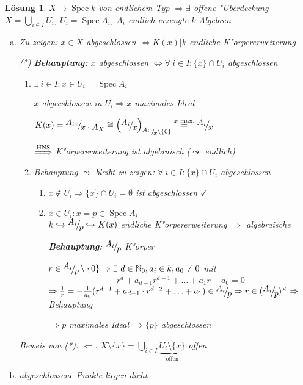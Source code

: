 \documentclass[paper = A4, fontsize=12pt, numbers=noendperiod, chapterprefix=true]{scrbook}
\theoremstyle{break}
\newtheorem{Loes}{L\"osung}
\theoremstyle{nonumberbreak}
\theoremstyle{nonumberplain}
\newcommand{\quot}[1]{\textrm{\glqq}{#1}\textrm{\grqq}}
\newcommand{\Bigcup}{\bigcup\limits}
\newenvironment{twosidedproof}{\begin{enumerate}[\quot{$\Rightarrow$}:]}{\end{enumerate}}
\newcommand{\proofforward}{\item[\quot{$\Rightarrow$}:]}
\newcommand{\proofreverse}{\item[\quot{$\Leftarrow$}:]}
\DeclareMathOperator{\Spec}{Spec}
\newcommand{\N}{\mathbb{N}}
\newcommand{\X}{\times}
\newcommand{\FakRaum}[2]{
	\raisebox{0.7ex}{\ensuremath{#1}}
	\ensuremath{\mkern-3mu}\big/\ensuremath{\mkern-3mu}
	\raisebox{-0.6ex}{\ensuremath{#2}}}
\newcommand{\smallFakRaum}[2]{
	\scriptsize{\raisebox{0.7ex}{\ensuremath{#1}}
	\ensuremath{\mkern-3mu}\ / \ensuremath{\mkern-3mu}
	\raisebox{-0.6ex}{\ensuremath{#2}}}}
\begin{document}
\begin{Loes}
$X \to \Spec k$ von endlichem Typ $\Rightarrow \exists$ offene "Uberdeckung $X = \bigcup_{i\in I} U_i$, $U_i = \Spec A_i$, $A_i$ endlich erzeugte $k$-Algebren
\begin{enumerate}[a)]
\item
	\emph{Zu zeigen:} $x \in X$ abgeschlossen $\Leftrightarrow K(x)|k$ endliche K"orpererweiterung
	
	(*) \textbf{Behauptung:} $x$ abgeschlossen $\Leftrightarrow \forall \ i \in I: \{x\} \cap U_i$ abgeschlossen
	
	\begin{twosidedproof}
	\proofforward
		$\exists \ i \in I: x \in U_i = \Spec A_i$
		
		$x$ abgecshlossen in $U_i \Rightarrow x$ maximales Ideal
		
		$K(x) = \FakRaum{A_{ix}}{x \cdot A_X} \cong \left( \FakRaum{A_i}{x} \right)_{\smallFakRaum{A_i}{x} \setminus \{0\}} \overset{x \text{ max.}}{=} \FakRaum{A_i}{x}$
		
		$\xRightarrow{\text{HNS}}$ K"orpererweiterung ist algebraisch ($\leadsto$ endlich)
	\proofreverse
		Behauptung $\leadsto$ bleibt zu zeigen: $\forall \ i \in I: \{x\} \cap U_i$ abgeschlossen
		\begin{enumerate}[$\bullet$)]
		\item
			$x \notin U_i \Rightarrow \{x\} \cap U_i = \emptyset$ ist abgeschlossen $\checkmark$
		\item
			$x \in U_i: x = p \in \Spec A_i$\\
			$k \hookrightarrow \FakRaum{A_i}{p} \hookrightarrow K(x)$ endliche K"orpererweiterung $\Rightarrow$ algebraische
			
			\textbf{Behauptung:} $\FakRaum{A_i}{p}$ K"orper
			
			$r \in \FakRaum{A_i}{p} \setminus \{0\} \Rightarrow  \exists \ d \in \N_0, a_i \in k, a_0 \ne 0$ mit
				\[ r^d + a_{d-1}r^{d-1} + \ldots + a_1r + a_0 = 0 \]
			$\Rightarrow \frac{1}{r} = -\frac{1}{a_0}( r^{d-1} + a_{d-1}\cdot r^{d-2} + \ldots +a_1) \in \FakRaum{A_i}{p} \Rightarrow r \in (\FakRaum{A_i}{p})^\X \Rightarrow$ Behauptung
			
			$\Rightarrow p$ maximales Ideal $\Rightarrow \{p\}$ abgeschlossen
		\end{enumerate}
	\end{twosidedproof}
	\emph{Beweis von (*):} \quot{$\Leftarrow$}: $X \setminus \{x\} = \Bigcup_{i \in I} \underbrace{U_i \setminus \{x\}}_{\text{offen}}$ offen
\item
	abgeschlossene Punkte liegen dicht
	

\end{enumerate}
\end{Loes}
\end{document}
